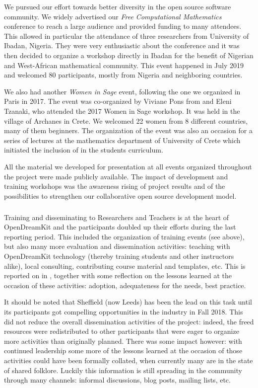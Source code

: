 We pursued our effort towards better diversity in the open source software community. We widely advertised our 
  \emph{Free Computational Mathematics} conference to reach a large audience and provided funding to many attendees. 
  This allowed in particular the attendance of three researchers from University of Ibadan, Nigeria. They were very enthusiastic 
  about the conference and it was then decided to organize a \Sage workshop directly in Ibadan for the benefit of Nigerian and 
  West-African mathematical community. This event happened in July 2019 and welcomed 80 participants, mostly from Nigeria and 
  neighboring countries.
  
  We also had another \emph{Women in Sage} event, following the one we organized in Paris in 2017. The event was co-organized
  by Viviane Pons from \ODK and Eleni Tzanaki, who attended the 2017 Women in Sage workshop. It was held in the village of Archanes
  in Crete. We welcomed 22 women from 8 different countries, many of them \Sage beginners. The organization of the event was also
  an occasion for a series of \Sage lectures at the mathematics department of University of Crete which initiated the inclusion of \Sage
  in the students curriculum.

All the material we developed for presentation at all events organized throughout the project were made publicly available. The impact of development and training workshops was the awareness rising of project results and of the possibilities to strengthen our collaborative open source development model. 
\subparagraph{}


Training and disseminating to Researchers and Teachers is at the heart
of OpenDreamKit and the participants doubled up their efforts during
the last reporting period. This included the organization of training
events (see  above), but also many
more evaluation and dissemination activities: teaching with
OpenDreamKit technology (thereby training students and other
instructors alike), local consulting, contributing course material and
templates, etc. This is reported on in
, together with some reflection on the
lessons learned at the occasion of these activities: adoption,
adequateness for the needs, best practice.

It should be noted that Sheffield (now Leeds) has been the lead on
this task until its participants got compelling opportunities in the
industry in Fall 2018. This did not reduce the overall dissemination
activities of the project: indeed, the freed resources were
redistributed to other participants that were eager to organize more
activities than originally planned. There was some impact however:
with continued leadership some more of the lessons learned at the
occasion of those activities could have been formally collated, when
currently many are in the state of shared folklore. Luckily this
information is still spreading in the community through many channels:
informal discussions, blog posts, mailing lists, etc.


